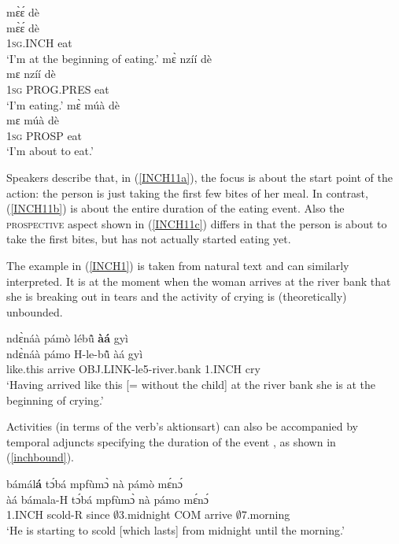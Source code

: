 \begin{exe} 
\ex\label{INCH11}
\begin{xlist}
\ex\label{INCH11a}
  \glll  mɛ̀ɛ́ dè  \\
         mɛ̀ɛ́ dè\\
           1\textsc{sg}.INCH eat    \\
    \trans `I'm at the beginning of eating.'
\ex\label{INCH11b}
  \glll  mɛ̀ nzíí dè  \\
         mɛ nzíí dè\\
           1\textsc{sg} PROG.PRES eat     \\
    \trans `I'm eating.'
\ex\label{INCH11c}
  \glll  mɛ̀ múà dè  \\
         mɛ múà dè\\
           1\textsc{sg} PROSP eat     \\
    \trans `I'm about to eat.'
\end{xlist}
\end{exe}

\noindent Speakers describe that, in (\ref{INCH11a}), the focus is about the start point of the action: the person is just taking the first few bites of her meal. In contrast, (\ref{INCH11b}) is about the entire duration of the eating event. Also the \textsc{prospective} aspect shown in (\ref{INCH11c}) differs in that the person is about to take the first bites, but has not actually started eating yet.

The example in (\ref{INCH1}) is taken from natural text and can similarly interpreted. It is at the moment when the woman arrives at the river bank that she is breaking out in tears and the activity of crying is (theoretically) unbounded.

\begin{exe} 
\ex\label{INCH1}
  \glll  ndɛ̀náà pámò lébũ̂ {\bfseries àá} gyì \\
         ndɛ̀náà pámo H-le-bũ̂ àá gyì \\
        like.this arrive OBJ.LINK-le5-river.bank 1.INCH cry \\
    \trans `Having arrived like this [= without the child] at the river bank she is at the beginning of crying.'
\end{exe}

Activities (in terms of the verb's aktionsart) can also be accompanied by temporal adjuncts specifying the duration of the event , as shown in (\ref{inchbound}).

\begin{exe} 
\ex\label{inchbound}
   bámál{\bfseries á} tɔ́bá mpfùmɔ̀ nà pámò mɛ́nɔ́\\
       àá bámala-H tɔ́bá mpfùmɔ̀ nà pámo mɛ́nɔ́ \\
       1.INCH scold-R since  $\emptyset$3.midnight COM arrive $\emptyset$7.morning \\
    \trans `He is starting to scold [which lasts] from midnight until the morning.'
\end{exe}

